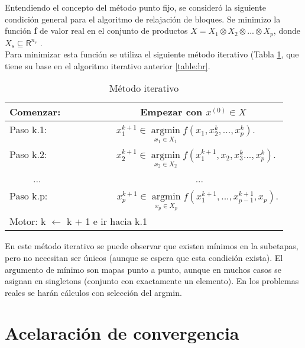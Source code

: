 Entendiendo el concepto del m\'etodo punto fijo, se consider\'o la siguiente condici\'on general para el algoritmo de relajaci\'on de bloques. Se minimizo la funci\'on \textbf{f} de valor real en el conjunto de productos $X = X_{1} \otimes X_{2} \otimes ... \otimes X_{p}$, donde $X_{s} \subseteq \mathsf{R}^{n_{s}
}$  .\\

Para minimizar esta funci\'on se utiliza el siguiente m\'etodo iterativo (Tabla \ref{table:MI}, que tiene su base en el algoritmo iterativo anterior \ref{table:br}.\\

\begin{table} [H]
  \centering
  \begin{tabular} {|l|}
    \hline
    Comenzar: \ \ \ \ \ \ \ \ \ \ \ \ \ \  Empezar con $x^{(0)} \in X$ \\
    \hline
    Paso k.1:  \ \ \ \ \ \ \ \ \ \ \ \ \ \ $x_{1}^{k+1} \in \underset{x_{1} \in X_{1}}{\operatorname{argmin}} f(x_{1},x_{2}^{k},...,x_{p}^{k}).$ \\
    
    Paso k.2:  \ \ \ \ \ \ \ \ \ \ \ \ \ \  $x_{2}^{k+1} \in \underset{x_{2} \in X_{2}}{\operatorname{argmin}} f(x_{1}^{k+1},x_{2},x_{3}^{k}...,x_{p}^{k}).$ \\
    
    \ \ \ \ \ ...  \ \ \ \ \ \ \ \ \ \ \ \ \ \ \ \ \ \ \ \ \ \ \ \ \ \ \ \ \ \ \ \ ... \\
    
    Paso k.p:  \ \ \ \ \ \ \ \ \ \ \ \ \ \   $x_{p}^{k+1} \in \underset{x_{p} \in X_{p}}{\operatorname{argmin}} f(x_{1}^{k+1},...,x_{p-1}^{k+1},x_{p}).$ \\
    \hline
    Motor: k $\leftarrow$ k + 1 e ir hacia k.1 \\
    \hline
    
  \end{tabular}
  \caption{M\'etodo iterativo}
  \label{table:MI}
\end{table}

En este m\'etodo iterativo se puede observar que existen m\'inimos en la subetapas, pero no necesitan ser \'unicos (aunque se espera que esta condici\'on exista). El argumento de m\'inimo son mapas punto a punto, aunque en muchos casos se asignan en singletons (conjunto con exactamente un elemento). En los problemas reales se har\'an c\'alculos con selecci\'on del argmin.\\


\section{Acelaraci\'on de convergencia}\label{sec:cn}

